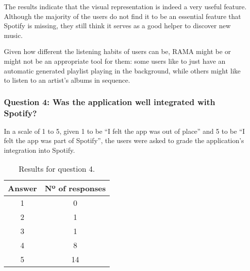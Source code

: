       The results indicate that the visual representation is indeed a very useful feature.
      Although the majority of the users do not find it to be an essential feature that Spotify is missing, they still think it serves as a good helper to discover new music.

      Given how different the listening habits of users can be, RAMA might be or might not be an appropriate tool for them: some users like to just have an automatic generated playlist playing in the background, while others might like to listen to an artist's albums in sequence.



    \subsubsection{Question 4: Was the application well integrated with Spotify?}
    \label{ssub:question_4}

      In a scale of 1 to 5, given 1 to be ``I felt the app was out of place'' and 5 to be ``I felt the app was part of Spotify'', the users were asked to grade the application's integration into Spotify.

      \begin{table}[H]
        \begin{center}
          \begin{tabular}{c|c}

            \hline
            \textbf{Answer} & \textbf{Nº of responses} \\
            \hline
            1 & 0 \\
            2 & 1 \\
            3 & 1 \\
            4 & 8 \\
            5 & 14 \\
            \hline
          \end{tabular}
        \end{center}
        \caption{Results for question 4.}
        \label{tab:question4}
       \end{table}

